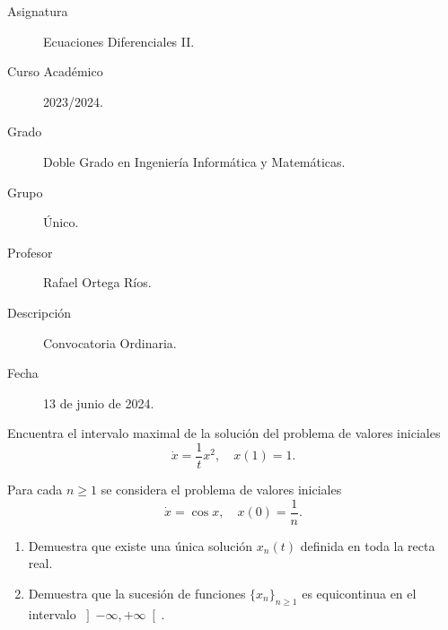 \documentclass[12pt]{article}
\begin{document}

    
    

    \begin{description}
        \item[Asignatura] Ecuaciones Diferenciales II.
        \item[Curso Académico] 2023/2024.
        \item[Grado] Doble Grado en Ingeniería Informática y Matemáticas.
        \item[Grupo] Único.
        \item[Profesor] Rafael Ortega Ríos.
        \item[Descripción] Convocatoria Ordinaria.
        \item[Fecha] 13 de junio de 2024.
    
    \end{description}
    \newpage


    
    \begin{ejercicio}
        Encuentra el intervalo maximal de la solución del problema de valores iniciales
        \[
        \dot{x} = \frac{1}{t}x^2, \quad x(1) = 1.
        \]
    \end{ejercicio}

    \begin{ejercicio}
        Para cada $n \geq 1$ se considera el problema de valores iniciales
        \[
        \dot{x} = \cos x, \quad x(0) = \frac{1}{n}.
        \]
        \begin{enumerate}[label=\alph*)]
            \item Demuestra que existe una única solución $x_n(t)$ definida en toda la recta real.
            \item Demuestra que la sucesión de funciones $\{x_n\}_{n \geq 1}$ es equicontinua en el intervalo $\left]-\infty, +\infty\right[$.
        \end{enumerate}
    \end{ejercicio}
\end{document}
